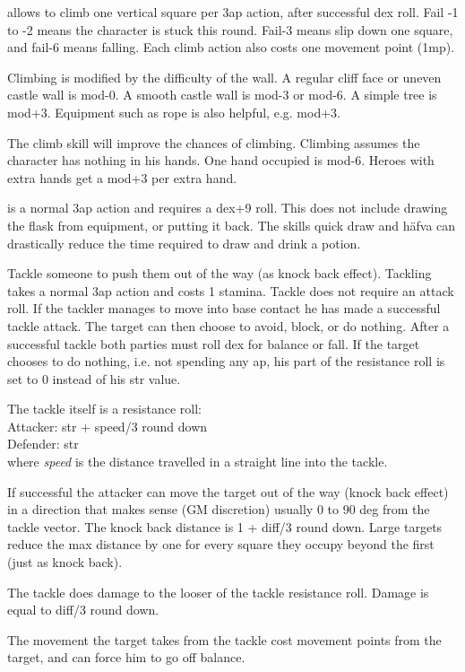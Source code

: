  allows to climb one vertical square per 3ap action, after successful dex roll. Fail -1 to -2 means the character is stuck this round. Fail-3 means slip down one square, and fail-6 means falling. Each climb action also costs one movement point (1mp).

Climbing is modified by the difficulty of the wall. A regular cliff face or uneven castle wall is mod-0. A smooth castle wall is mod-3 or mod-6. A simple tree is mod+3. Equipment such as rope is also helpful, e.g. mod+3.

The climb skill will improve the chances of climbing.
Climbing assumes the character has nothing in his hands. One hand occupied is mod-6. Heroes with extra hands get a mod+3 per extra hand.


 is a normal 3ap action and requires a dex+9 roll. This does not include drawing the flask from equipment, or putting it back. The skills quick draw and häfva can drastically reduce the time required to draw and drink a potion.


 Tackle someone to push them out of the way (as knock back effect). Tackling takes a normal 3ap action and costs 1 stamina. Tackle does not require an attack roll. If the tackler manages to move into base contact he has made a successful tackle attack. The target can then choose to avoid, block, or do nothing. After a successful tackle both parties must roll dex for balance or fall. If the target chooses to do nothing, i.e. not spending any ap, his part of the resistance roll is set to 0 instead of his str value.

The tackle itself is a resistance roll: \\
Attacker: str + speed/3 round down \\
Defender: str\\
where \emph{speed} is the distance travelled in a straight line into the tackle.

If successful the attacker can move the target out of the way (knock back effect) in a direction that makes sense (GM discretion) usually 0 to 90 deg from the tackle vector. The knock back distance is 1 + diff/3 round down. Large targets reduce the max distance by one for every square they occupy beyond the first (just as knock back).

The tackle does damage to the looser of the tackle resistance roll. Damage is equal to diff/3 round down.

The movement the target takes from the tackle cost movement points from the target, and can force him to go off balance.

